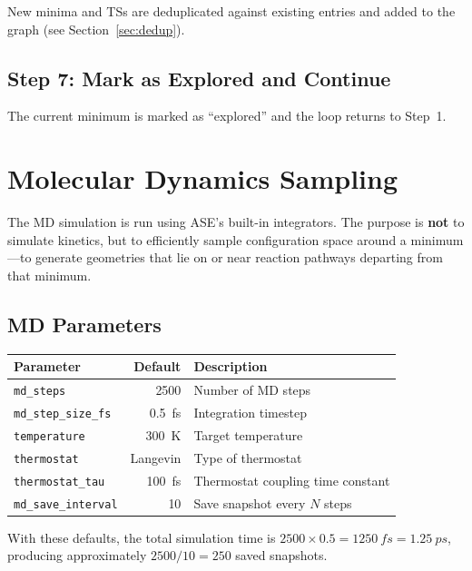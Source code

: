 \documentclass[11pt,a4paper]{article}
\begin{document}
New minima and TSs are deduplicated against existing entries and added to the graph (see Section~\ref{sec:dedup}).

\subsection{Step 7: Mark as Explored and Continue}

The current minimum is marked as ``explored'' and the loop returns to Step~1.


\section{Molecular Dynamics Sampling}
\label{sec:md}

The MD simulation is run using ASE's built-in integrators. The purpose is \textbf{not} to simulate kinetics, but to efficiently sample configuration space around a minimum---to generate geometries that lie on or near reaction pathways departing from that minimum.

\subsection{MD Parameters}

\begin{threshbox}
\begin{tabular}{lrl}
\toprule
Parameter & Default & Description \\
\midrule
\texttt{md\_steps} & 2500 & Number of MD steps \\
\texttt{md\_step\_size\_fs} & \SI{0.5}{fs} & Integration timestep \\
\texttt{temperature} & \SI{300}{K} & Target temperature \\
\texttt{thermostat} & Langevin & Type of thermostat \\
\texttt{thermostat\_tau} & \SI{100}{fs} & Thermostat coupling time constant \\
\texttt{md\_save\_interval} & 10 & Save snapshot every $N$ steps \\
\bottomrule
\end{tabular}
\end{threshbox}

\noindent With these defaults, the total simulation time is $2500 \times 0.5 = \SI{1250}{fs} = \SI{1.25}{ps}$, producing approximately $2500/10 = 250$ saved snapshots.
\end{document}
